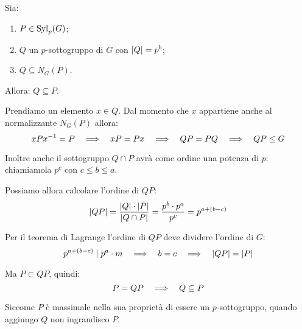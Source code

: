 \begin{lemma}
    Sia:
    \begin{enumerate}
        \item $P \in \operatorname{Syl}_p(G)$;
        \item $Q$ un $p$-sottogruppo di $G$ con $\lvert Q \rvert = p^b$;
        \item $Q \subseteq N_G(P)$.
    \end{enumerate}

    Allora: $Q \subseteq P$.
\end{lemma}
\begin{dimostrazione}
    Prendiamo un elemento $x \in Q$.
    Dal momento che $x$ appartiene anche al normalizzante $N_G(P)$ allora:
    \begin{equation*}
        xPx^{-1} = P \quad\Longrightarrow\quad xP = Px \quad\Longrightarrow\quad QP = PQ \quad\Longrightarrow\quad QP \le G
    \end{equation*}

    Inoltre anche il sottogruppo $Q \cap P$ avrà come ordine una potenza di $p$: chiamiamola $p^c$ con $c \le b \le a$.

    Possiamo allora calcolare l'ordine di $QP$:
    \begin{equation*}
        \lvert QP \rvert = \dfrac{\lvert Q \rvert \cdot \lvert P \rvert}{\lvert Q \cap P \rvert} = \dfrac{p^b \cdot p^a}{p^c} = p^{a+(b-c)}
    \end{equation*}

    Per il teorema di Lagrange l'ordine di $QP$ deve dividere l'ordine di $G$:
    \begin{equation*}
        p^{a + (b-c)} \mid p^a \cdot m \quad\Longrightarrow\quad b = c \quad\Longrightarrow\quad \lvert QP \rvert = \lvert P \rvert
    \end{equation*}

    Ma $P \subset QP$, quindi:
    \begin{equation*}
        P = QP \quad\Longrightarrow\quad Q \subseteq P
    \end{equation*}

    Siccome $P$ è massimale nella sua proprietà di essere un $p$-sottogruppo, quando aggiungo $Q$ non ingrandisco $P$.
\end{dimostrazione}

